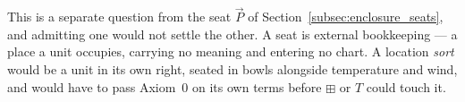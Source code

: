 \documentclass[12pt, a4paper]{article}
\begin{document}
This is a separate question from the seat $\vec P$ of
Section~\ref{subsec:enclosure_seats}, and admitting one would not
settle the other. A seat is external bookkeeping --- a place a unit
occupies, carrying no meaning and entering no chart. A location
\emph{sort} would be a unit in its own right, seated in bowls
alongside temperature and wind, and would have to pass Axiom~0 on its
own terms before $\boxplus$ or $T$ could touch it.
\end{document}
